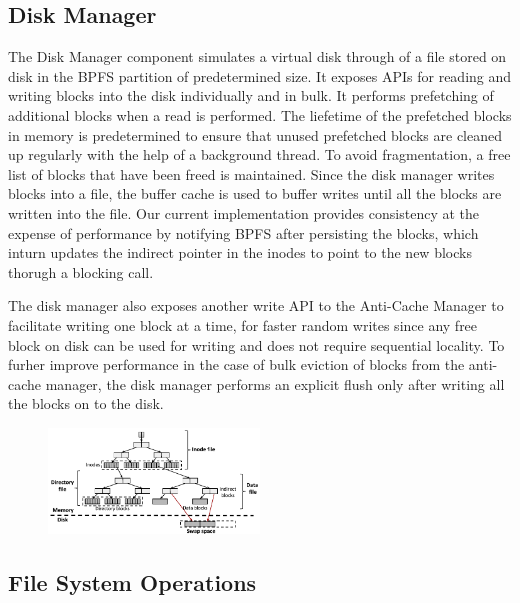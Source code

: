 \subsection{Disk Manager}
The Disk Manager component simulates a virtual disk through of a file stored on disk in the BPFS partition of predetermined size. It exposes APIs for reading and writing blocks into the disk individually and in bulk. It performs prefetching of additional blocks when a read is performed. The liefetime of the prefetched blocks in memory is predetermined to ensure that unused prefetched blocks are cleaned up regularly with the help of a background thread. To avoid fragmentation, a free list of blocks that have been freed is maintained. Since the disk manager writes blocks into a file, the buffer cache is used to buffer writes until all the blocks are written into the file. Our current implementation provides consistency at the expense of performance by notifying BPFS after persisting the blocks, which inturn updates the indirect pointer in the inodes to point to the new blocks thorugh a blocking call.

The disk manager also exposes another write API to the Anti-Cache Manager to facilitate writing one block at a time, for faster random writes since any free block on disk can be used for writing and does not require sequential locality. To furher improve performance in the case of bulk eviction of blocks from the anti-cache manager, the disk manager performs an explicit flush only after writing all the blocks on to the disk.

\begin{figure}
\centering
\vspace{-0.2in}
\includegraphics[width=0.5\textwidth]{figs/bpfs2.pdf}
\vspace{-0.2in}
\end{figure}

\subsection{File System Operations}
